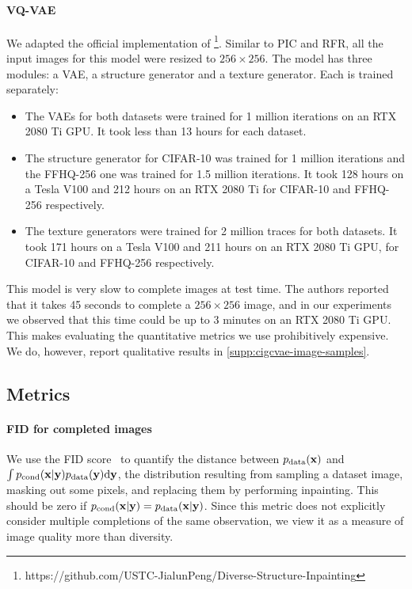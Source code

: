 \paragraph{VQ-VAE} We adapted the official implementation of
\citet{peng2021generating}\footnote{https://github.com/USTC-JialunPeng/Diverse-Structure-Inpainting}.
Similar to PIC and RFR, all the input images for this model were resized to
$256 \times 256$. The model has three modules: a VAE, a structure generator and
a texture generator. Each is trained separately:
\begin{itemize}
\item The VAEs for both datasets were trained for 1 million iterations on an RTX
  2080 Ti GPU. It took less than 13 hours for each dataset.
  \item The structure generator for CIFAR-10 was trained for 1 million
        iterations and the FFHQ-256 one was trained for 1.5 million iterations.
        It took 128 hours on a Tesla V100 and 212 hours on an RTX 2080 Ti for
        CIFAR-10 and FFHQ-256 respectively.
  \item The texture generators were trained for 2 million traces for both
        datasets. It took 171 hours on a Tesla V100 and 211 hours on an RTX 2080
        Ti GPU, for CIFAR-10 and FFHQ-256 respectively.
\end{itemize}
This model is very slow to complete images at test time. The authors reported
that it takes 45 seconds to complete a $256 \times 256$ image, and in our
experiments we observed that this time could be up to 3 minutes on an RTX 2080
Ti GPU. This makes evaluating the quantitative metrics we use prohibitively
expensive. We do, however, report qualitative results in
\cref{supp:cigcvae-image-samples}.


\subsection{Metrics} \label{supp:cigcvae-metrics}
\paragraph{FID for completed images}
We use the FID score~\citep{heusel2017gans} to quantify the distance between
$p_{\rm{data}}{}(\mathbf{x}{})$ and $\int p_{\text{cond}}{}(\mathbf{x}{}|\mathbf{y}{}) p_{\rm{data}}{}(\mathbf{y}{})
\mathrm{d}\mathbf{y}{}$, the distribution resulting from sampling a dataset image,
masking out some pixels, and replacing them by performing inpainting. This
should be zero if $p_{\text{cond}}{}(\mathbf{x}{}|\mathbf{y}{}) = p_{\rm{data}}{}(\mathbf{x}{}|\mathbf{y}{})$. Since
this metric does not explicitly consider multiple completions of the same
observation, we view it as a measure of image quality more than diversity.

